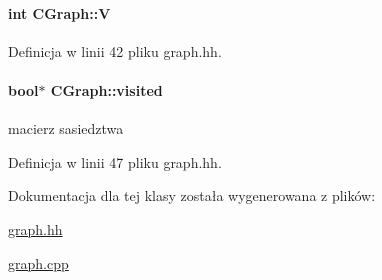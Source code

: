 \paragraph[{V}]{\setlength{\rightskip}{0pt plus 5cm}int C\+Graph\+::\+V\hspace{0.3cm}{\ttfamily [private]}}\label{class_c_graph_a76914f22c12c93e293c392342a4a233c}


Definicja w linii 42 pliku graph.\+hh.

\hypertarget{class_c_graph_a8478f38bd0487246450f933dc4403227}{}
\paragraph[{visited}]{\setlength{\rightskip}{0pt plus 5cm}bool$\ast$ C\+Graph\+::visited\hspace{0.3cm}{\ttfamily [private]}}\label{class_c_graph_a8478f38bd0487246450f933dc4403227}
macierz sasiedztwa 

Definicja w linii 47 pliku graph.\+hh.



Dokumentacja dla tej klasy została wygenerowana z plików\+:\begin{DoxyCompactItemize}
\item 
\hyperlink{graph_8hh}{graph.\+hh}\item 
\hyperlink{graph_8cpp}{graph.\+cpp}\end{DoxyCompactItemize}
